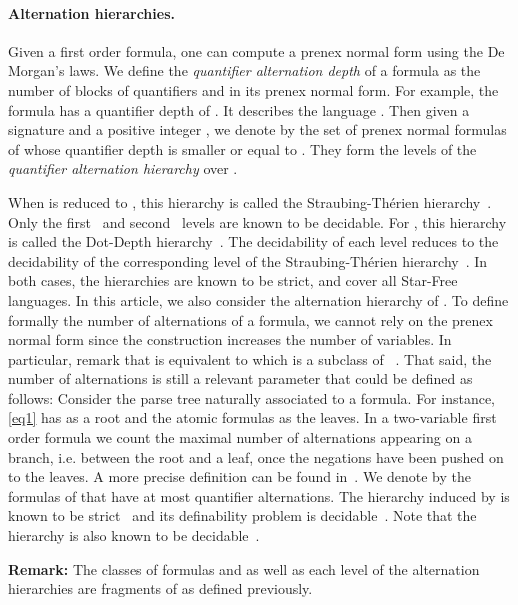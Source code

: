 \documentclass[submission,hidelink]{dmtcs-episciences}
\begin{document}
\paragraph{Alternation hierarchies.}
	Given a first order formula, one can compute a prenex normal form using the De Morgan's laws.
	We define the \emph{quantifier alternation depth} of a formula as the number of blocks  of quantifiers  and  in its prenex normal form.
	For example, the formula  has a quantifier depth of .
	It describes the language .
	Then given a signature  and a positive integer , we denote by  the set of prenex normal formulas of  whose quantifier depth is smaller or equal to .
 They form the levels of the \emph{quantifier alternation hierarchy} over .

	When  is reduced to , this hierarchy is called the Straubing-Th\'erien hierarchy~\citep{Straubing81,Th81}.
	Only the first~\citep{SI75} and second~\citep{PZ14} levels are known to be decidable.
	For , this hierarchy is called the Dot-Depth hierarchy~\citep{BC71}.
	The decidability of each level reduces to the decidability of the corresponding
	level of the Straubing-Th\'erien hierarchy~\citep{Straubing85}.
	In both cases, the hierarchies are known to be strict, and cover all Star-Free languages.
	In this article, we also consider the alternation hierarchy of .
	To define formally the number of alternations of a formula,
	we cannot rely on the prenex normal form since the construction increases the number of variables.
	In particular, remark that  is equivalent to  which
	is a subclass of ~\citep{DGK08}.
	 That said, the number
	of alternations is still a relevant parameter that could be defined as follows:
	Consider the parse tree naturally associated to a formula. For instance,
	\eqref{eq1} has  as a root  and the atomic formulas as the leaves.
	In a two-variable first order formula we count the maximal number of alternations appearing on a branch, i.e. between the
	root and a leaf,
	once the negations have been pushed on to the leaves. A more precise definition
	can be found in~\cite{IW09}. We denote by 
	the formulas of  that have at most  quantifier alternations.
	The hierarchy induced by  is known to be strict~\citep{IW09} and its definability
	problem is decidable~\citep{KS12,KW12}.
	Note that the hierarchy  is also known to be decidable~\citep{KL13}.

	\textbf{Remark:} The classes of formulas  and 
	as well as each level of the alternation hierarchies are fragments of  as defined previously.
\end{document}

